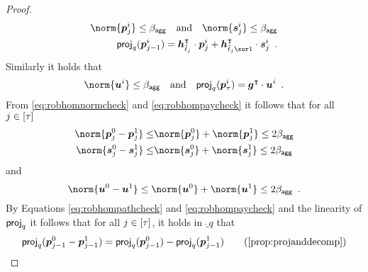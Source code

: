 \begin{proof}
\begin{align}
  \norm{\vec{p}^i_{j}} \leq \bagg\quad\text{and}\quad
  \norm{\vec{s}^i_{j}} \leq \bagg\label{eq:robhomnormcheck}\\
  \projmod{q}(\vec{p}^i_{j-1}) = \vec{h}_{\tilde t_j}^\transpose\cdot \vec{p}^i_{j} + \vec{h}_{\tilde t_j\xor 1}^\transpose \cdot \vec{s}^i_{j}\enspace.\label{eq:robhompathcheck}
  \end{align}
  Similarly it holds that
  \begin{align}
  \norm{\vec{u}^i} \leq \bagg\quad \text{and}\quad \projmod{q}(\vec{p}^i_{\tau}) = \vec{g}^\transpose\cdot \vec{u}^i\label{eq:robhompaycheck}\enspace.
  \end{align}
From \autoref{eq:robhomnormcheck} and \autoref{eq:robhompaycheck} it follows that for all $j \in [\tau]$
  \begin{align*}
    \norm{\vec{p}_j^0-\vec{p}_j^1} \leq& \norm{\vec{p}_j^0} + \norm{\vec{p}_j^1} \leq 2\bagg\\
    \norm{\vec{s}_j^0-\vec{s}_j^1} \leq& \norm{\vec{s}_j^0} + \norm{\vec{s}_j^1} \leq 2\bagg
  \end{align*}
  and
  \[
      \norm{\vec{u}^0-\vec{u}^1} \leq \norm{\vec{u}^0} + \norm{\vec{u}^1} \leq 2\bagg\enspace.
  \]
%
By Equations \ref{eq:robhompathcheck} and \ref{eq:robhompaycheck} and the linearity of $\mathsf{proj}_{q}$ it follows that for all $j \in [\tau]$, it holds in $\ring_q$ that
  \begin{align*}
    \projmod{q}(\vec{p}^0_{j-1}-\vec{p}^1_{j-1})
    ={} &\projmod{q}(\vec{p}^0_{j-1})-\projmod{q}(\vec{p}^1_{j-1})\tag{\autoref{prop:projanddecomp}}\\

\end{align*}
\end{proof}
